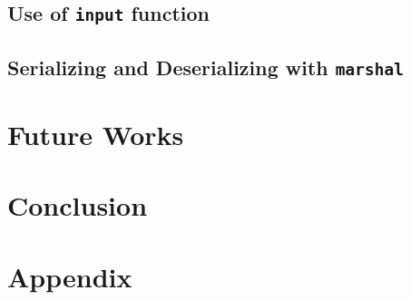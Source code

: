 \documentclass[sigconf]{acmart}
\begin{document}
\subsection{Use of \texttt{input} function}

\subsection{Serializing and Deserializing with \texttt{marshal}}

\section{Future Works}

\section{Conclusion}

\section{Appendix}



\end{document}
